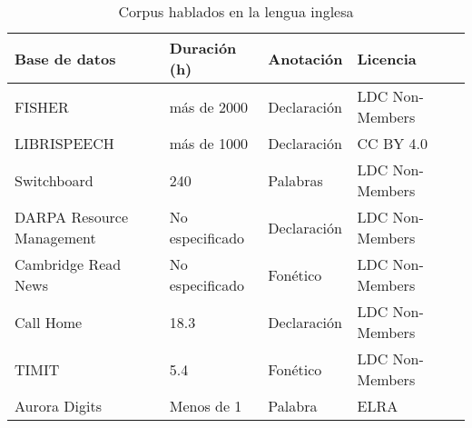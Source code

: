 \begin{table}[H]
\centering
\caption{Corpus hablados en la lengua inglesa}
\label{tab:english_corpora}
\begin{tabular}{|l|l|l|l|l|}
\textbf{Base de datos} & \textbf{Duración (h)} & \textbf{Anotación} & \textbf{Licencia}\\
\hline
FISHER\cite{CieriTheSpeech-to-Text}  & más de 2000 &  Declaración & LDC Non-Members\\
\hline
LIBRISPEECH\cite{PanayotovLIBRISPEECH:BOOKS}  & más de 1000  &  Declaración & CC BY 4.0\\
\hline

Switchboard \cite{Godfrey1992SWITCHBOARD:Development}  & 240  & Palabras & LDC Non-Members\\
\hline
\multicolumn{1}{|p{3.4cm}|}{DARPA Resource Management \cite{Lucke1992ExpandingCorpus}} & No especificado   & Declaración & LDC Non-Members \\
\hline
Cambridge Read News \cite{RobinsonWSJCAM0:RECOGNITION}  & No especificado  & Fonético & LDC Non-Members\\
\hline
Call Home  \cite{Fu-HuaLiuSpeechCorpus} & 18.3  & Declaración & LDC Non-Members\\
\hline
TIMIT \cite{PriceTheRecognition} & 5.4  & Fonético  & LDC Non-Members\\
\hline
Aurora Digits \cite{EvansEfficientCorpus}  & Menos de 1 & Palabra & ELRA\\
\hline



\end{tabular}
\end{table}